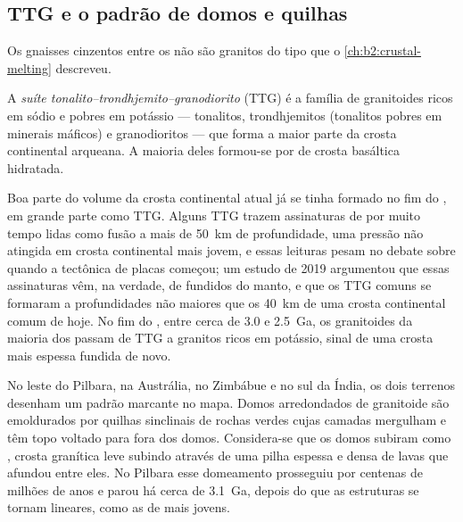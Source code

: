\subsection*{TTG e o padrão de domos e quilhas}

Os gnaisses cinzentos entre os  não são granitos do tipo que o
\cref{ch:b2:crustal-melting} descreveu.

\begin{definition}\label{def:b2:precambrian-earth:ttg}
A \emph{suíte tonalito--trondhjemito--granodiorito}
(TTG) é a família de granitoides ricos em sódio e pobres em potássio --- tonalitos,
trondhjemitos (tonalitos pobres em minerais máficos) e granodioritos --- que forma a maior parte da
crosta continental arqueana. A maioria deles formou-se por  de crosta basáltica
hidratada.
\end{definition}

Boa parte do volume da crosta continental atual já se tinha formado no fim do , em grande parte
como TTG. Alguns TTG trazem assinaturas de  por muito tempo lidas como fusão a mais de
\qty{50}{km} de profundidade, uma pressão não atingida em crosta continental mais jovem, e essas leituras
pesam no debate sobre quando a tectônica de placas começou; um estudo de 2019 argumentou que essas assinaturas
vêm, na verdade, de fundidos do manto, e que os TTG comuns se formaram a
profundidades não maiores que os \qty{40}{km} de uma crosta continental comum de hoje. No fim do
, entre cerca de 3.0 e \qty{2.5}{Ga}, os granitoides da maioria dos  passam de TTG
a granitos ricos em potássio, sinal de uma crosta mais espessa fundida de novo.

No leste do Pilbara, na Austrália, no Zimbábue e no sul da Índia, os dois terrenos desenham um
padrão marcante no mapa. Domos arredondados de granitoide são emoldurados por quilhas sinclinais de rochas verdes cujas camadas mergulham e têm topo voltado para fora dos domos. Considera-se que os
domos subiram como , crosta granítica leve subindo através de uma pilha espessa e densa de
lavas que afundou entre eles. No Pilbara esse domeamento prosseguiu por centenas de milhões de
anos e parou há cerca de \qty{3.1}{Ga}, depois do que as estruturas se tornam lineares, como as
de  mais jovens.

